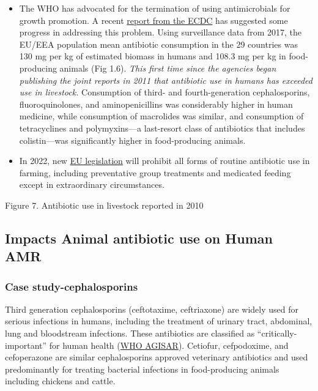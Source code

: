 \documentclass[
]{book}
\begin{document}
\begin{itemize}
\item
  The WHO has advocated for the termination of using antimicrobials for growth promotion. A recent \href{https://www.ecdc.europa.eu/sites/default/files/documents/JIACRA-III-Antimicrobial-Consumption-and-Resistance-in-Bacteria-from-Humans-and-Animals.pdf}{report from the ECDC} has suggested some progress in addressing this problem. Using surveillance data from 2017, the EU/EEA population mean antibiotic consumption in the 29 countries was 130 mg per kg of estimated biomass in humans and 108.3 mg per kg in food-producing animals (Fig 1.6). \emph{This first time since the agencies began publishing the joint reports in 2011 that antibiotic use in humans has exceeded use in livestock.} Consumption of third- and fourth-generation cephalosporins, fluoroquinolones, and aminopenicillins was considerably higher in human medicine, while consumption of macrolides was similar, and consumption of tetracyclines and polymyxins---a last-resort class of antibiotics that includes colistin---was significantly higher in food-producing animals.
\item
  In 2022, new \href{https://eur-lex.europa.eu/legal-content/EN/TXT/PDF/?uri=CELEX:32019R0006\&from=EN}{EU legislation} will prohibit all forms of routine antibiotic use in farming, including preventative group treatments and medicated feeding except in extraordinary circumstances.
\end{itemize}

Figure 7. Antibiotic use in livestock reported in 2010

\hypertarget{impacts-animal-antibiotic-use-on-human-amr}{%
\subsection*{Impacts Animal antibiotic use on Human AMR}\label{impacts-animal-antibiotic-use-on-human-amr}}

\hypertarget{case-study-cephalosporins}{%
\subsubsection*{Case study-cephalosporins}\label{case-study-cephalosporins}}

Third generation cephalosporins (ceftotaxime, ceftriaxone) are widely used for serious infections in humans, including the treatment of urinary tract, abdominal, lung and bloodstream infections. These antibiotics are classified as ``critically-important'' for human health (\href{http://www.agisar.org/}{WHO AGISAR}). Cetiofur, cefpodoxime, and cefoperazone are similar cephalosporins approved veterinary antibiotics and used predominantly for treating bacterial infections in food-producing animals including chickens and cattle.
\end{document}
